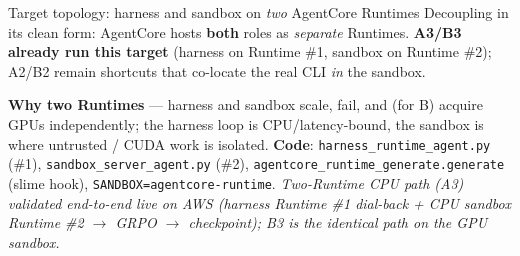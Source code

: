 \documentclass[aspectratio=169]{beamer}
\begin{document}
\begin{frame}{Target topology: harness and sandbox on \emph{two} AgentCore Runtimes}
  \footnotesize Decoupling  in its clean form: AgentCore hosts \textbf{both} roles as
  \emph{separate} Runtimes. \textbf{A3/B3 already run this target} (harness on Runtime \#1, sandbox on
  Runtime \#2); A2/B2 remain shortcuts that co-locate the real CLI \emph{in} the sandbox.
  \begin{center}
  \end{center}
  \vspace{-0.1em}
  {\scriptsize \textbf{Why two Runtimes} --- harness and sandbox scale, fail, and (for B) acquire
  GPUs independently; the harness loop is CPU/latency-bound, the sandbox is where untrusted /
  CUDA work is isolated. \textbf{Code}: \texttt{harness\_runtime\_agent.py} (\#1),
  \texttt{sandbox\_server\_agent.py} (\#2), \texttt{agentcore\_runtime\_generate.generate} (slime
  hook), \texttt{SANDBOX=agentcore-runtime}. \emph{Two-Runtime CPU path (A3) validated end-to-end
  live on AWS (harness Runtime \#1 dial-back + CPU sandbox Runtime \#2 $\to$ GRPO $\to$ checkpoint);
  B3 is the identical path on the GPU sandbox.}}
\end{frame}
\end{document}
